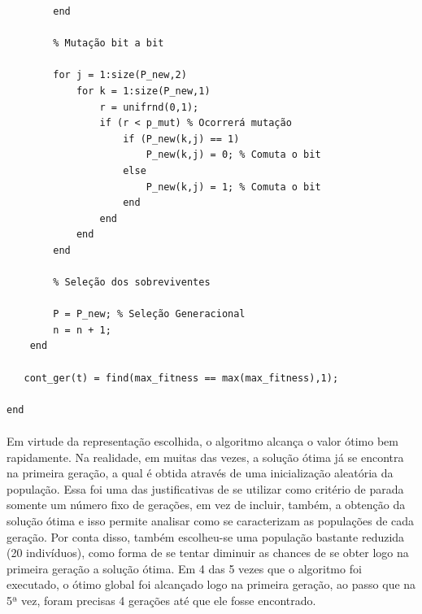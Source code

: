\documentclass{report}
\begin{document}
\begin{lstlisting}
        end
        
        % Mutação bit a bit
        
        for j = 1:size(P_new,2)
            for k = 1:size(P_new,1)
                r = unifrnd(0,1); 
                if (r < p_mut) % Ocorrerá mutação
                    if (P_new(k,j) == 1)
                        P_new(k,j) = 0; % Comuta o bit
                    else
                        P_new(k,j) = 1; % Comuta o bit
                    end
                end
            end
        end

        % Seleção dos sobreviventes

        P = P_new; % Seleção Generacional
        n = n + 1;
    end

   cont_ger(t) = find(max_fitness == max(max_fitness),1);

end

	\end{lstlisting}
	
	\paragraph{} Em virtude da representação escolhida, o algoritmo alcança o valor ótimo bem rapidamente. Na realidade, em muitas das vezes, a solução ótima já se encontra na primeira geração, a qual é obtida através de uma inicialização aleatória da população. Essa foi uma das justificativas de se utilizar como critério de parada somente um número fixo de gerações, em vez de incluir, também, a obtenção da solução ótima e isso permite analisar como se caracterizam as populações de cada geração. Por conta disso, também escolheu-se uma população bastante reduzida (20 indivíduos), como forma de se tentar diminuir as chances de se obter logo na primeira geração a solução ótima. Em 4 das 5 vezes que o algoritmo foi executado, o ótimo global foi alcançado logo na primeira geração, ao passo que na 5ª vez, foram precisas 4 gerações até que ele fosse encontrado.\\ 
	
\end{document}
